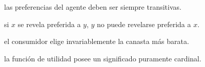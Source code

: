\begin{opts}
    \item las preferencias del agente deben ser siempre transitivas.
    \item si $x$ se revela preferida a $y$, $y$ no puede revelarse preferida a $x$.
    \item el consumidor elige invariablemente la canasta más barata.
    \item la función de utilidad posee un significado puramente cardinal.
\end{opts}
